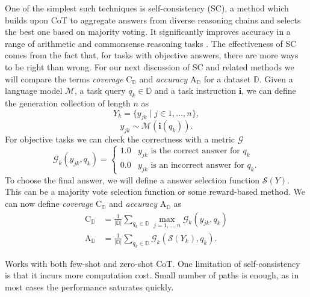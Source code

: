 One of the simplest such techniques is self-consistency\cite{wang2023selfconsistencyimproveschainthought} (SC),
a method which builds upon CoT to aggregate answers from diverse reasoning 
chains and selects the best one based on majority voting. 
It significantly improves accuracy in a range of arithmetic and commonsense reasoning tasks \cite{wang2023selfconsistencyimproveschainthought}.
The effectiveness of SC comes from the fact that, for tasks with objective answers, there are more ways to be right than wrong.
For our next discussion of SC and related methods we will compare the 
terms \textit{coverage} $\mathrm{C}_{\mathbb{D}}$ and \textit{accuracy} $\mathrm{A}_{\mathbb{D}}$ for a dataset ${\mathbb{D}}$.
Given a language model $\mathcal{M}$, a task query $q_k \in {\mathbb{D}}$ and a task 
instruction $\mathbf{i}$, we can define the generation collection of length $n$ as
\begin{equation}
    Y_k = \{y_{jk}\mid j \in 1, ..., n\},
\end{equation}
\begin{equation}
    y_{jk} \sim \mathcal{M}(\mathbf{i}(q_k)).
\end{equation}
For objective tasks we can check the correctness with a metric $\mathcal{G}$
\begin{equation}
    \mathcal{G}_{k}(y_{jk}, q_k) = 
    \begin{cases}
        1.0 & y_{jk} \text{ is the correct answer for } q_k\\
        0.0 & y_{jk} \text{ is an incorrect answer for } q_k.
    \end{cases}
\end{equation}
To choose the final answer, we will define a answer selection function $\mathcal{S}(Y)$. 
This can be a majority vote selection function or some reward-based method.
We can now define \textit{coverage} $\mathrm{C}_{\mathbb{D}}$ and \textit{accuracy} $\mathrm{A}_{\mathbb{D}}$ as
\begin{align}
    \mathrm{C}_{\mathbb{D}} &= \frac{1}{|\mathbb{D}|} \sum_{q_k \in \mathbb{D}} \max_{j=1,...,n} \mathcal{G}_k(y_{jk}, q_k) \\
    \mathrm{A}_{\mathbb{D}} &= \frac{1}{|\mathbb{D}|} \sum_{q_k \in \mathbb{D}} \mathcal{G}_k\left( \mathcal{S}(Y_k), q_k \right).
\end{align}



Works with both few-shot and zero-shot CoT. \cite{wang2023selfconsistencyimproveschainthought}
One limitation of self-consistency is that it incurs more computation cost. 
Small number of paths is enough, as in most cases the performance saturates quickly. \cite{wang2023selfconsistencyimproveschainthought}




